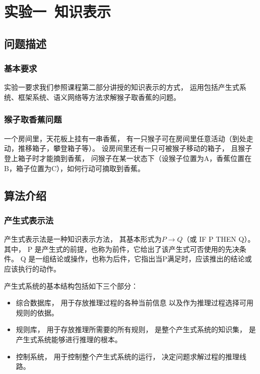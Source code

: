 \documentclass[12pt,onecolumn]{report}
\theoremstyle{plain}
\numberwithin{figure}{section}
\begin{document}
\chapter{实验一~知识表示}
\section{问题描述}
\subsection{基本要求}
实验一要求我们参照课程第二部分讲授的知识表示的方式，
运用包括产生式系统、框架系统、语义网络等方法求解猴子取香蕉的问题。

\subsection{猴子取香蕉问题}
一个房间里，天花板上挂有一串香蕉，
有一只猴子可在房间里任意活动（到处走动，推移箱子，攀登箱子等）。
设房间里还有一只可被猴子移动的箱子，
且猴子登上箱子时才能摘到香蕉，
问猴子在某一状态下（设猴子位置为A，香蕉位置在B，箱子位置为C），如何行动可摘取到香蕉。

\section{算法介绍}

\subsection{产生式表示法}
产生式表示法是一种知识表示方法，
其基本形式为$P \to Q$（或 IF P THEN Q）。
其中， P 是产生式的前提，也称为前件，它给出了该产生式可否使用的先决条件。
Q 是一组结论或操作，也称为后件，它指出当P满足时，应该推出的结论或应该执行的动作。

产生式系统的基本结构包括如下三个部分：
\begin{itemize}[fullwidth,itemindent=\parindent]
\item 综合数据库，
  用于存放推理过程的各种当前信息
  以及作为推理过程选择可用规则的依据。
\item 规则库，
  用于存放推理所需要的所有规则，
  是整个产生式系统的知识集，
  是产生式系统能够进行推理的根本。
\item 控制系统，
  用于控制整个产生式系统的运行，
  决定问题求解过程的推理线路。
\end{itemize}
\end{document}
